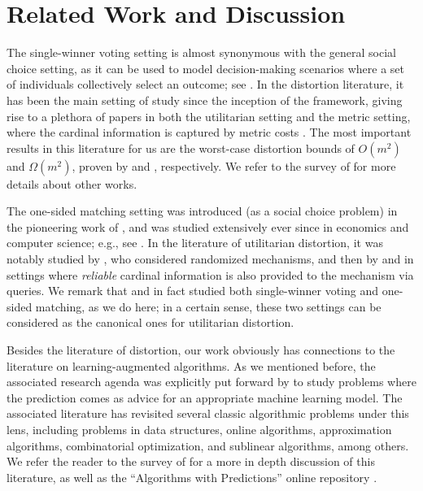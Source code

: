 \section{Related Work and Discussion}
The single-winner voting setting is almost synonymous with the general social choice setting, as it can be used to model decision-making scenarios where a set of individuals collectively select an outcome; see \citep{brandt2012computational}. In the distortion literature, it has been the main setting of study since the inception of the framework, giving rise to a plethora of papers in both the utilitarian setting \citep{caragiannis2011voting,caragiannis2017subset,filos2014truthful,boutilier2015optimal} and the metric setting, where the cardinal information is captured by metric costs \citep{anshelevich2017randomized,anshelevich2018approximating,caragiannis2022multiwinner,charikar24breaking,feldman2016voting,gkatzelis2020resolving,kempe2022veto}. The most important results in this literature for us are the worst-case distortion bounds of $O(m^2)$ and $\Omega(m^2)$, proven by \citet{caragiannis2011voting} and \citet{caragiannis2017subset}, respectively. We refer to the survey of \citet{distortion-survey} for more details about other works. 

The one-sided matching setting was introduced (as a social choice problem) in the pioneering work of \citet{hylland1979efficient}, and was studied extensively ever since in economics and computer science; e.g., see \citep{abdulkadirouglu1998random,abdulkadirouglu2005boston,bogomolnaia2001new,Anshelevich2016truthful,Anshelevich2019bipartitematching,caragiannis2024augmentation}. In the literature of utilitarian distortion, it was notably studied by \citet{filos2014RSD}, who considered randomized mechanisms, and then by \cite{amanatidis2022few,ABFV24,ma2021matching} and \citet{ES25} in settings where \emph{reliable} cardinal information is also provided to the mechanism via queries. We remark that \cite{ABFV24} and \cite{ES25} in fact studied both single-winner voting and one-sided matching, as we do here; in a certain sense, these two settings can be considered as the canonical ones for utilitarian distortion. 

Besides the literature of distortion, our work obviously has connections to the literature on learning-augmented algorithms. As we mentioned before, the associated research agenda was explicitly put forward by \citet{lykouris2021competitive} to study problems where the prediction comes as advice for an appropriate machine learning model. The associated literature has revisited several classic algorithmic problems under this lens, including problems in data structures, online algorithms, approximation algorithms, combinatorial optimization, and sublinear algorithms, among others. We refer the reader to the survey of \citet{mitzenmacher2022algorithms} for a more in depth discussion of this literature, as well as the ``Algorithms with Predictions'' online repository \citep{ALPS}. 

